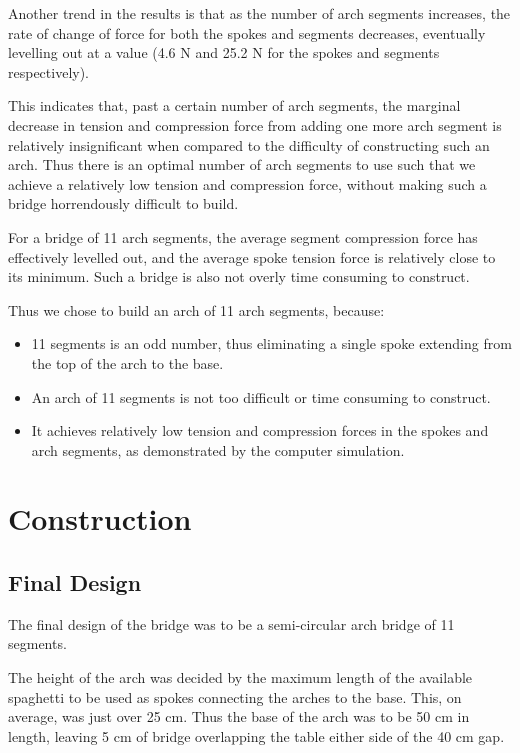 \documentclass[a4paper,11pt]{article}
\begin{document}
Another trend in the results is that as the number of arch segments increases,
the rate of change of force for both the spokes and segments decreases,
eventually levelling out at a value (4.6 N and 25.2 N for the spokes and
segments respectively).

This indicates that, past a certain number of arch segments, the marginal
decrease in tension and compression force from adding one more arch segment is
relatively insignificant when compared to the difficulty of constructing such an
arch. Thus there is an optimal number of arch segments to use such that we
achieve a relatively low tension and compression force, without making such a
bridge horrendously difficult to build.

For a bridge of 11 arch segments, the average segment compression
force has effectively levelled out, and the average spoke tension force is
relatively close to its minimum.
Such a bridge is also not overly time consuming to construct.

Thus we chose to build an arch of 11 arch segments, because:

\begin{itemize}
\item 11 segments is an odd number, thus eliminating a single spoke extending
	from the top of the arch to the base.
\item An arch of 11 segments is not too difficult or time consuming to
	construct.
\item It achieves relatively low tension and compression forces in the spokes
	and arch segments, as demonstrated by the computer simulation.
\end{itemize}




\section{Construction}

\subsection{Final Design}

The final design of the bridge was to be a semi-circular arch bridge of 11
segments.

The height of the arch was decided by the maximum length of the available
spaghetti to be used as spokes connecting the arches to the base.
This, on average, was just over 25 cm.
Thus the base of the arch was to be 50 cm in length, leaving 5 cm of bridge
overlapping the table either side of the 40 cm gap.
\end{document}
